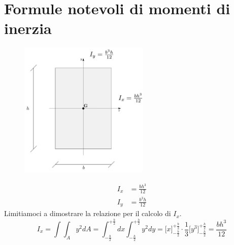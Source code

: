 \section{Formule notevoli di momenti di inerzia}
\renewcommand{\thefigure}{2~-~1}
\begin{figure}[ht]
\centering
\includegraphics[width=0.55\textwidth]{Immagini/Parte_2/Figura2_1/Figura2_1.pdf}
\caption{}
\label{figura2-1}
\end{figure}
\begin{align}
I_x &= \frac{bh^{3}}{12} \tag{2.3a} \label{equazione2-3a} \\
I_y &= \frac{b^{3}h}{12} \tag{2.3b} \label{equazione2-3b}
\end{align}
Limitiamoci a dimostrare la relazione per il calcolo di $I_x$. 
\begin{equation*}
I_x = \int\int_A y^{2}dA = \int_{-\frac{b}{2}}^{+\frac{b}{2}}dx\int_{-\frac{h}{2}}^{+\frac{h}{2}}y^{2}dy = \bigl[x\bigr]_{-\frac{b}{2}}^{+\frac{b}{2}}\cdot \frac{1}{3}\bigl[y^3\bigr]_{-\frac{h}{2}}^{+\frac{h}{2}} = \frac{bh^3}{12}
\end{equation*}
